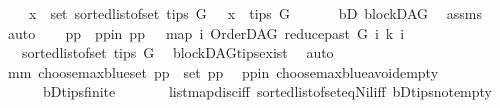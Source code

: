 \begin{isabellebody}
\ \ \ \ {\isachardoublequoteopen}x\ {\isasymin}\ set\ {\isacharparenleft}{\kern0pt}sorted{\isacharunderscore}{\kern0pt}list{\isacharunderscore}{\kern0pt}of{\isacharunderscore}{\kern0pt}set\ {\isacharparenleft}{\kern0pt}tips\ G{\isacharparenright}{\kern0pt}{\isacharparenright}{\kern0pt}{\isachardoublequoteclose}\ \ {\isachardoublequoteopen}\ x\ {\isasymin}\ tips\ G{\isachardoublequoteclose}\isanewline
%
\isadelimproof
%
\endisadelimproof
%
\isatagproof
{}\isamarkupfalse%
\ {\isacharminus}{\kern0pt}\ \isanewline
\ \ \isamarkupfalse%
\ bD{\isacharcolon}{\kern0pt}\ blockDAG\ \isamarkupfalse%
\ assms\ \isamarkupfalse%
\ auto\isanewline
\ \ \isamarkupfalse%
\ pp\ \ pp{\isacharunderscore}{\kern0pt}in{\isacharcolon}{\kern0pt}\ {\isachardoublequoteopen}pp\ {\isacharequal}{\kern0pt}\ \ {\isacharparenleft}{\kern0pt}map\ {\isacharparenleft}{\kern0pt}{\isasymlambda}i{\isachardot}{\kern0pt}\ {\isacharparenleft}{\kern0pt}OrderDAG\ {\isacharparenleft}{\kern0pt}reduce{\isacharunderscore}{\kern0pt}past\ G\ i{\isacharparenright}{\kern0pt}\ k{\isacharcomma}{\kern0pt}\ i{\isacharparenright}{\kern0pt}{\isacharparenright}{\kern0pt}\isanewline
\ \ \ {\isacharparenleft}{\kern0pt}sorted{\isacharunderscore}{\kern0pt}list{\isacharunderscore}{\kern0pt}of{\isacharunderscore}{\kern0pt}set\ {\isacharparenleft}{\kern0pt}tips\ G{\isacharparenright}{\kern0pt}{\isacharparenright}{\kern0pt}{\isacharparenright}{\kern0pt}{\isachardoublequoteclose}\ \isamarkupfalse%
\ blockDAG{\isachardot}{\kern0pt}tips{\isacharunderscore}{\kern0pt}exist\ \isamarkupfalse%
\ auto\isanewline
\ \ \isamarkupfalse%
\ mm{\isacharcolon}{\kern0pt}\ {\isachardoublequoteopen}choose{\isacharunderscore}{\kern0pt}max{\isacharunderscore}{\kern0pt}blue{\isacharunderscore}{\kern0pt}set\ pp\ {\isasymin}\ set\ pp{\isachardoublequoteclose}\ \isamarkupfalse%
\ pp{\isacharunderscore}{\kern0pt}in\ choose{\isacharunderscore}{\kern0pt}max{\isacharunderscore}{\kern0pt}blue{\isacharunderscore}{\kern0pt}avoid{\isacharunderscore}{\kern0pt}empty\isanewline
\ \ \ \ \ \ bD{\isachardot}{\kern0pt}tips{\isacharunderscore}{\kern0pt}finite\ \isanewline
\ \ \ \ \ \ list{\isachardot}{\kern0pt}map{\isacharunderscore}{\kern0pt}disc{\isacharunderscore}{\kern0pt}iff\ sorted{\isacharunderscore}{\kern0pt}list{\isacharunderscore}{\kern0pt}of{\isacharunderscore}{\kern0pt}set{\isacharunderscore}{\kern0pt}eq{\isacharunderscore}{\kern0pt}Nil{\isacharunderscore}{\kern0pt}iff\ bD{\isachardot}{\kern0pt}tips{\isacharunderscore}{\kern0pt}not{\isacharunderscore}{\kern0pt}empty\ \isanewline

\end{isabellebody}
